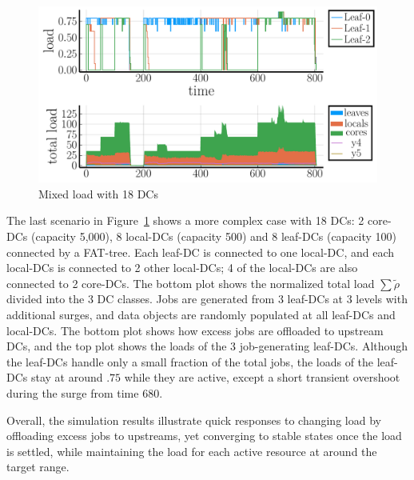 

\begin{figure}[tb]
  \centering
  \includegraphics[width=\columnwidth]{18nodes.pdf}
  \vspace{-2.0ex}
  \caption{Mixed load with 18 DCs}
  \label{fig:18nodes}
\end{figure}

The last scenario in Figure~\ref{fig:18nodes} shows a more complex case with
18 DCs: 2 core-DCs (capacity 5,000), 8 local-DCs (capacity 500) and 8 leaf-DCs
(capacity 100) connected by a FAT-tree.
Each leaf-DC is connected to one local-DC, and each local-DCs is connected to
2 other local-DCs; 4 of the local-DCs are also connected to 2 core-DCs.
The bottom plot shows the normalized total load $\sum \tilde{\rho}$
divided into the 3 DC classes.
Jobs are generated from 3 leaf-DCs at 3 levels with additional surges,
and data objects are randomly populated at all leaf-DCs and local-DCs.
The bottom plot shows how excess jobs are offloaded to upstream DCs,
and the top plot shows the loads of the 3 job-generating leaf-DCs.
Although the leaf-DCs handle only a small fraction of the total jobs,
the loads of the leaf-DCs stay at around $.75$ while they are
active, except a short transient overshoot during the surge from time
680.

Overall, the simulation results illustrate quick responses to changing
load by offloading excess jobs to upstreams,
yet converging to stable states once the load is settled,
while maintaining the load for each active resource at around the target
range.

